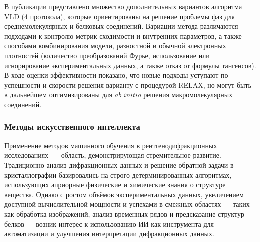 В публикации \cite{burla_phasing_2011} представлено множество дополнительных вариантов алгоритма VLD (4 протокола), которые ориентированы на решение проблемы фаз для среднемолекулярных и белковых соединений. Вариации метода различаются подходами к контролю метрик сходимости и внутренних параметров, а также способами комбинирования модели, разностной и обычной электронных плотностей (количество преобразований Фурье, использование или игнорирование экспериментальных данных, а также отказ от формулы тангенсов). В ходе оценки эффективности показано, что новые подходы уступают по успешности и скорости решения варианту с процедурой RELAX, но могут быть в дальнейшем оптимизированы для $ab$ $initio$ решения макромолекулярных соединений.


\subsubsection{Методы искусственного интеллекта}

Применение методов машинного обучения в рентгенодифракционных исследованиях~--- область, демонстрирующая стремительное развитие. Традиционно анализ дифракционных данных и решение обратной задачи в кристаллографии базировались на строго детерминированных алгоритмах, использующих априорные физические и химические знания о структуре вещества. Однако с ростом объёмов экспериментальных данных, увеличением доступной вычислительной мощности и успехами в смежных областях — таких как обработка изображений, анализ временных рядов и предсказание структур белков — возник интерес к использованию ИИ как инструмента для автоматизации и улучшения интерпретации дифракционных данных.

